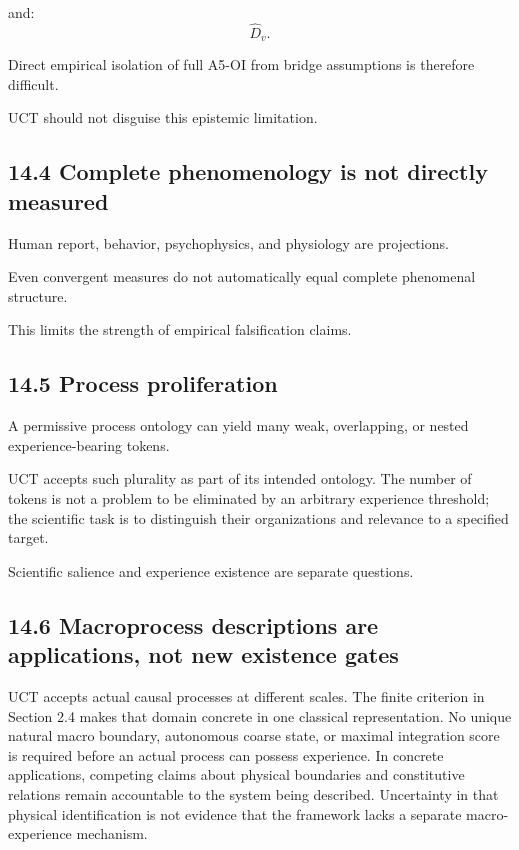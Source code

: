 \documentclass[
  11pt,
  a4paper,
]{article}
\begin{document}
and:
\nopagebreak[4]
\[
\widehat D_v.
\]

Direct empirical isolation of full A5-OI from bridge assumptions is
therefore difficult.

UCT should not disguise this epistemic limitation.

\hypertarget{complete-phenomenology-is-not-directly-measured}{%
\subsection{14.4 Complete phenomenology is not directly
measured}\label{complete-phenomenology-is-not-directly-measured}}

Human report, behavior, psychophysics, and physiology are projections.

Even convergent measures do not automatically equal complete phenomenal
structure.

This limits the strength of empirical falsification claims.

\hypertarget{process-proliferation}{%
\subsection{14.5 Process proliferation}\label{process-proliferation}}

A permissive process ontology can yield many weak, overlapping, or
nested experience-bearing tokens.

UCT accepts such plurality as part of its intended ontology. The number
of tokens is not a problem to be eliminated by an arbitrary experience
threshold; the scientific task is to distinguish their organizations and
relevance to a specified target.

Scientific salience and experience existence are separate questions.

\hypertarget{macroprocess-descriptions-are-applications-not-new-existence-gates}{%
\subsection{14.6 Macroprocess descriptions are applications, not new
existence
gates}\label{macroprocess-descriptions-are-applications-not-new-existence-gates}}

UCT accepts actual causal processes at different scales. The finite
criterion in Section 2.4 makes that domain concrete in one classical
representation. No unique natural macro boundary, autonomous coarse
state, or maximal integration score is required before an actual process
can possess experience. In concrete applications, competing claims about
physical boundaries and constitutive relations remain accountable to the
system being described. Uncertainty in that physical identification is
not evidence that the framework lacks a separate macro-experience
mechanism.
\end{document}
